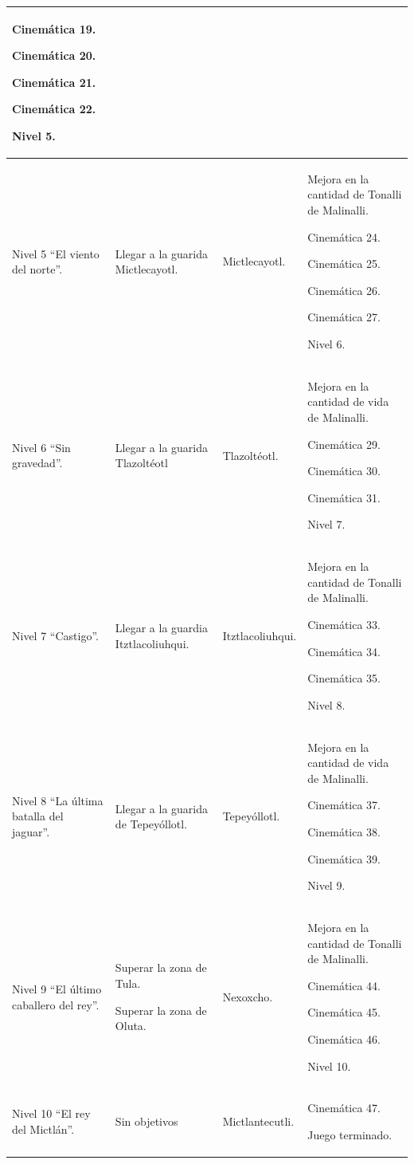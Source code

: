 \begin{longtable}[c]{ | m{3.75cm} | m{3.75cm}| m{3.75cm} | m{3.75cm}|}
			 Cinemática 19.
			 \par
			 Cinemática 20.
			 \par
			 Cinemática 21.
			 \par
			 Cinemática 22.
			 \par
			 Nivel 5.		 
		 \\ 
		\hline
		Nivel 5 “El viento del norte”. & 
		Llegar a la guarida Mictlecayotl.&
		Mictlecayotl. &
		Mejora en la cantidad de Tonalli de Malinalli.
		\par
		Cinemática 24.
		\par
		Cinemática 25.
		\par
		Cinemática 26.
		\par
		Cinemática 27.
		\par
		Nivel 6.		 
		 \\ 
		\hline
		Nivel 6 “Sin gravedad”. & 
		Llegar a la guarida Tlazoltéotl &
		Tlazoltéotl. &
		Mejora en la cantidad de vida de Malinalli.
		\par
		Cinemática 29.
		\par
		Cinemática 30.
		\par
		Cinemática 31.
		\par
		 Nivel 7.		 
		 \\ 
		\hline
		Nivel 7 “Castigo”. & 
		Llegar a la guardia Itztlacoliuhqui. &
		Itztlacoliuhqui. &
		Mejora en la cantidad de Tonalli de Malinalli.
		\par
		Cinemática 33.
		\par
		Cinemática 34.
		\par
		Cinemática 35.
		\par
		Nivel 8.		 
		 \\ 
		\hline
		Nivel 8 “La última batalla del jaguar”. & 
		Llegar a la guarida de Tepeyóllotl.&
		Tepeyóllotl. &
		Mejora en la cantidad de vida de Malinalli.
		\par		
		Cinemática 37.
		\par
		Cinemática 38.
		\par
		Cinemática 39.
		\par
		Nivel 9.		 
		 \\ 
		\hline
		Nivel 9 “El último caballero del rey”. & 
		Superar la zona de Tula.
		\par
		Superar la zona de Oluta.&
		Nexoxcho. &
		Mejora en la cantidad de Tonalli de Malinalli.
		\par		
		Cinemática 44.
		\par
		Cinemática 45.
		\par
		Cinemática 46.
		\par
		Nivel 10. 
		 \\ 
		\hline
		Nivel 10 “El rey del Mictlán”. & 
		Sin objetivos &
		Mictlantecutli. &
		Cinemática 47.
		\par		
		Juego terminado. 
		 \\ 
		\hline
	\end{longtable}

